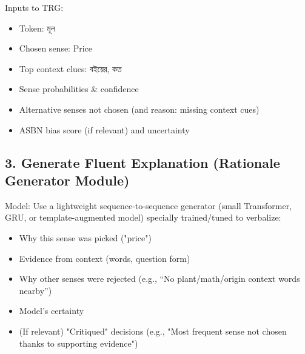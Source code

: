 \documentclass[a4paper,12pt]{article}
\begin{document}
Inputs to TRG:

\begin{itemize}
    \item Token: \textbengali{মূল}
    \item Chosen sense: Price
    \item Top context clues: \textbengali{বইয়ের}, \textbengali{কত}
    \item Sense probabilities \& confidence
    \item Alternative senses not chosen (and reason: missing context cues)
    \item ASBN bias score (if relevant) and uncertainty
    \end{itemize}

\subsection*{3. Generate Fluent Explanation (Rationale Generator Module)}

Model:
Use a lightweight sequence-to-sequence generator (small Transformer, GRU, or template-augmented model) specially trained/tuned to verbalize:

\begin{itemize}
    \item Why this sense was picked ("price")
    \item Evidence from context (words, question form)
    \item Why other senses were rejected (e.g., “No plant/math/origin context words nearby”)
    \item Model’s certainty
    \item (If relevant) "Critiqued" decisions (e.g., "Most frequent sense not chosen thanks to supporting evidence")
\end{itemize}
\end{document}
